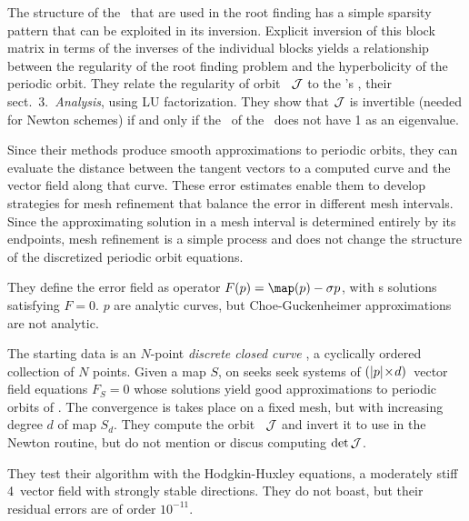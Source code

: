 \begin{description}
{The structure of the \jacobianMs\ that are used in the root finding has a
simple sparsity pattern that can be exploited in its inversion. Explicit
inversion of this block matrix in terms of the inverses of the individual
blocks yields a relationship between the regularity of the root finding
problem and the hyperbolicity of the periodic orbit.
They relate the regularity of orbit \jacobianM\ ${\cal J}$ to the
\po's \monodromyM, their sect.~3.~{\em Analysis},
using LU factorization. They show that ${\cal J}$ is invertible
(needed for Newton schemes) if and only if the \monodromyM\ \monodromy of the
\PoincSec\ does not have 1 as an eigenvalue.

Since their methods produce smooth approximations to periodic orbits,
they can evaluate the distance between the tangent vectors to a computed
curve and the vector field along that curve. These error estimates enable
them to develop strategies for mesh refinement that balance the error in
different mesh intervals. Since the approximating solution in a mesh
interval is determined entirely by its endpoints, mesh refinement is a
simple process and does not change the structure of the discretized
periodic orbit equations.

They define the error field  as operator
$F(p)=\map(p)-\sigma p$, with \po s solutions satisfying $F=0$. $p$ are
analytic curves, but Choe-Guckenheimer approximations are not analytic.

The starting data is an $N$-point \emph{discrete closed curve}
, a cyclically ordered collection of $N$ points. Given
a map $S$, on seeks seek systems of $({|p|}\!\times\!d)$\dmn\ vector
field equations $F_S=0$ whose solutions yield good approximations to
periodic orbits of \map.
The convergence is takes place on a fixed mesh, but with increasing
degree $d$ of map $S_d$. They compute the orbit \jacobianM\ ${\cal J}$
and invert it to use in the Newton routine,
but do not mention or discus computing $\det\cal J$.

They test their algorithm with the Hodgkin-Huxley equations, a moderately
stiff 4\dmn\ vector field with strongly stable directions. They do not
boast, but their residual errors are of order $10^{-11}$.
    }







\end{description}





